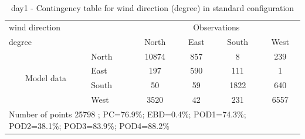 \begin{table}[p!]
\begin{center}
\begin{tabular}{llcccc}
\hline
{wind direction}                                       &                             &    \multicolumn{4}{c}{Observations}                 \\
{degree}                                       &                             & {North}   & {East} & {South} & {West} \\
\hline
\multicolumn{1}{c}{\multirow{4}{*}{Model data}}  & {North}                    & 10874   & 857    & 8     & 239\\
                                                 & {East}                     & 197   & 590    & 111     & 1\\
                                                 & {South}                    & 50   & 59   & 1822    & 640\\
                                                 & {West}                     & 3520  & 42   & 231    & 6557\\
\hline 
\multicolumn{6}{l}{ Number of points        25798 ; PC=76.9\%; EBD=0.4\%; POD1=74.3\%; POD2=38.1\%; POD3=83.9\%; POD4=88.2\%}                 \\
\end{tabular}
\end{center}
\caption{day1 - Contingency table for {wind direction} (degree) in standard configuration}
\label{tab:contingencywdBEF:day1}
\end{table}
